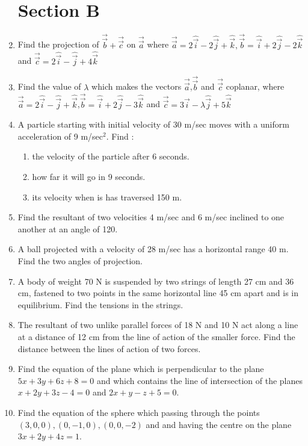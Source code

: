 \documentclass[journal,12pt,twocolumn]{IEEEtran}
\begin{document}
\begin{enumerate}
 \section{Section B}
 \medskip
 \item Find the projection of $\overrightarrow{\vec{b}}+\overrightarrow{\vec{c}}$ on $\overrightarrow{\vec{a}}$ where $\overrightarrow{\vec{a}}=2\hat{\vec{i}}-2\hat{\vec{j}}+\hat{\vec{k}} , \overrightarrow{\vec{b}}=\hat{\vec{i}}+2\hat{\vec{j}}-2\hat{\vec{k}}$ and $ \overrightarrow{\vec{c}}=2\hat{\vec{i}}-\hat{\vec{j}}+4\hat{\vec{k}}$
 \medskip
 \item Find the value of $\lambda$ which makes the vectors $\overrightarrow{\vec{a}}$,$\overrightarrow{\vec{b}}$ and $\overrightarrow{\vec{c}}$ coplanar, where $ \overrightarrow{\vec{a}}=2\hat{\vec{i}}-\hat{\vec{j}}+\hat{\vec{k}}$,$ \overrightarrow{\vec{b}}=\hat{\vec{i}}+2\hat{\vec{j}}-3\hat{\vec{k}}$ and $ \overrightarrow{\vec{c}}=3\hat{\vec{i}}-\lambda\hat{\vec{j}}+5\hat{\vec{k}}$
 \medskip
\item  A particle starting with initial velocity of 30 m/sec moves with a uniform acceleration of 9 m/sec$^2$. Find :
\begin{enumerate}
   \item the velocity of the particle after 6 seconds.
   \item how far it will go in 9 seconds.
   \item its velocity when is has traversed 150 m.
\end{enumerate}
\medskip
\item Find the resultant of two velocities 4 m/sec and 6 m/sec inclined to one another at an angle of 120\degree.
\medskip
\item A ball projected with a velocity of 28 m/sec has a horizontal range 40 m. Find the two angles of projection.
\medskip
\item A body of weight 70 N is suspended by two strings of length 27 cm and 36 cm, fastened to two points in the same horizontal line 45 cm apart and is in equilibrium. Find the tensions in the strings.
\medskip
\item The resultant of two unlike parallel forces of 18 N and 10 N act along a line at a distance of 12 cm from the line of action of the smaller force. Find the distance between the lines of action of two forces.
\medskip
\item Find the equation of the plane which is perpendicular to the plane $5x + 3y + 6 z + 8 = 0$ and which contains the line of intersection of the planes $x + 2y + 3z - 4 = 0 $ and $2x + y - z + 5 = 0$.
\medskip
\item Find the equation of the sphere which passing through the points $ (3, 0, 0), (0, -1, 0), (0, 0, -2)$ and and having the centre on the plane $3x + 2y + 4z = 1$.

\end{enumerate}
\end{document}
